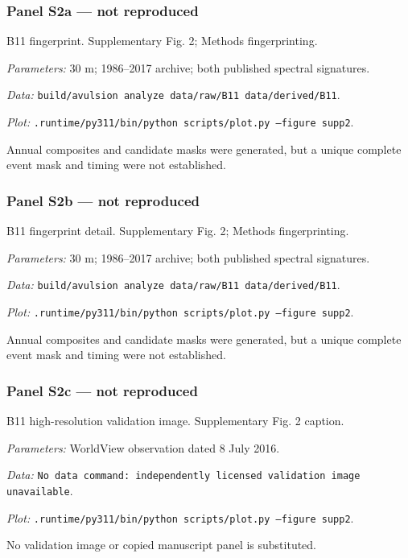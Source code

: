 \subsubsection*{Panel S2a --- not reproduced}
B11 fingerprint. Supplementary Fig. 2; Methods fingerprinting.

\textit{Parameters:} 30 m; 1986--2017 archive; both published spectral signatures.

\textit{Data:} \texttt{build/\allowbreak{}avulsion analyze data/\allowbreak{}raw/\allowbreak{}B11 data/\allowbreak{}derived/\allowbreak{}B11}.

\textit{Plot:} \texttt{.runtime/\allowbreak{}py311/\allowbreak{}bin/\allowbreak{}python scripts/\allowbreak{}plot.py --figure supp2}.

Annual composites and candidate masks were generated, but a unique complete event mask and timing were not established.

\subsubsection*{Panel S2b --- not reproduced}
B11 fingerprint detail. Supplementary Fig. 2; Methods fingerprinting.

\textit{Parameters:} 30 m; 1986--2017 archive; both published spectral signatures.

\textit{Data:} \texttt{build/\allowbreak{}avulsion analyze data/\allowbreak{}raw/\allowbreak{}B11 data/\allowbreak{}derived/\allowbreak{}B11}.

\textit{Plot:} \texttt{.runtime/\allowbreak{}py311/\allowbreak{}bin/\allowbreak{}python scripts/\allowbreak{}plot.py --figure supp2}.

Annual composites and candidate masks were generated, but a unique complete event mask and timing were not established.

\subsubsection*{Panel S2c --- not reproduced}
B11 high-resolution validation image. Supplementary Fig. 2 caption.

\textit{Parameters:} WorldView observation dated 8 July 2016.

\textit{Data:} \texttt{No data command: independently licensed validation image unavailable}.

\textit{Plot:} \texttt{.runtime/\allowbreak{}py311/\allowbreak{}bin/\allowbreak{}python scripts/\allowbreak{}plot.py --figure supp2}.

No validation image or copied manuscript panel is substituted.

